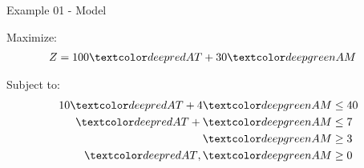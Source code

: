 \begin{frame}{Example 01 - Model}

Maximize:
\begin{align*}
    Z &= 100\colora{AT} + 30\colorb{AM}
\end{align*}

Subject to:
\begin{align*}
    10\colora{AT} + 4\colorb{AM} &\le 40 \\
      \colora{AT} +  \colorb{AM} &\le 7 \\
      \colorb{AM} &\ge 3 \\
      \colora{AT}, \colorb{AM} &\ge 0
\end{align*}

\end{frame}

